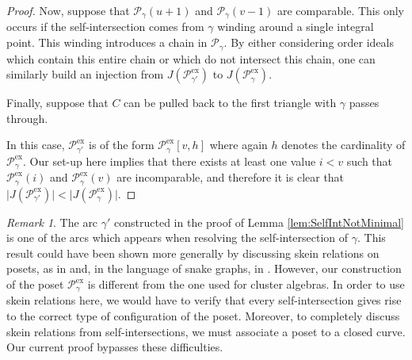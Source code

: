\documentclass[12pt, letterpaper,table]{amsart}
\theoremstyle{remark}
\newtheorem{remark}[theorem]{Remark}
\newcommand{\calP}{\mathcal{P}}
\newcommand{\exx}{\mathrm{ex}}
\begin{document}
\begin{proof}
 Now, suppose that $\calP_\gamma(u+1)$ and $\calP_\gamma(v-1)$ are comparable. This only occurs if the self-intersection comes from $\gamma$ winding around a single integral point. This winding introduces a chain in $\calP_\gamma$. By either considering order ideals which contain this entire chain or which do not intersect this chain, one can similarly build an injection from $J(\calP_{\gamma'}^\exx)$ to $J(\calP_\gamma^\exx)$.

Finally, suppose that $C$ can be pulled back to the first triangle with $\gamma$ passes through. 

\begin{center}
\end{center}

In this case, $\calP_{\gamma'}^\exx$ is of the form $\calP_{\gamma}^\exx[v,h]$ where again $h$ denotes the cardinality of $\calP_{\gamma}^\exx$. Our set-up here implies that there exists at least one value $i < v$ such that $\calP_{\gamma}^\exx(i)$ and $\calP_{\gamma}^\exx(v)$ are incomparable, and therefore it is clear that $\vert J(\calP_{\gamma'}^\exx) \vert < \vert J(\calP_{\gamma}^\exx) \vert$.
\end{proof}

\begin{remark}
The arc $\gamma'$ constructed in the proof of Lemma \ref{lem:SelfIntNotMinimal} is one of the arcs which appears when resolving the self-intersection of $\gamma$. This result could have been shown more generally by discussing skein relations on posets, as in \cite{banaian2024skein} and, in the language of snake graphs, in \cite{CS15}.  However, our construction of the poset $\calP_\gamma^\exx$ is different from the one used for cluster algebras. In order to use skein relations here, we would have to verify that every self-intersection gives rise to the correct type of configuration of the poset. Moreover, to completely discuss skein relations from self-intersections, we must associate a poset to a closed curve.  Our current proof bypasses these difficulties. 

\end{remark}
\end{document}
